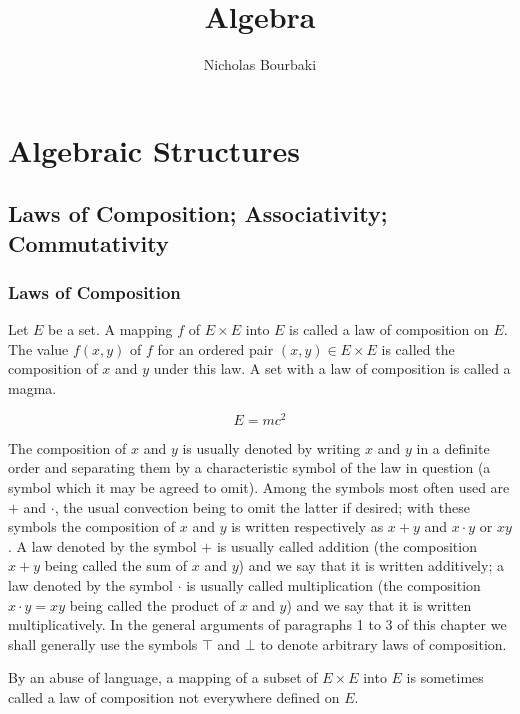 \documentclass[twoside,usebookdim]{bourbaki}
\title{Algebra}
\author{Nicholas Bourbaki}
\begin{document}
\frontmatter
\maketitle
\tableofcontents
\mainmatter
\chapter{Algebraic Structures}
\section{Laws of Composition; Associativity; Commutativity}
\subsection{Laws of Composition}

\begin{definition}
Let $E$ be a set. A mapping $f$ of $E\times E$ into $E$ is called a law
of composition on $E$. The value $f(x,y)$ of $f$ for an ordered pair
$(x,y)\in E\times E$ is called the composition of $x$ and $y$ under this
law. A set with a law of composition is called a magma.
\end{definition}

\begin{equation}
E = mc^{2}
\end{equation}

The composition of $x$ and $y$ is usually denoted by writing $x$ and $y$
in a definite order and separating them by a characteristic symbol of
the law in question (a symbol which it may be agreed to omit). Among the
symbols most often used are $+$ and $\cdot$, the usual convection being
to omit the latter if desired; with these symbols the composition of $x$
and $y$ is written respectively as $x + y$ and $x\cdot y$ or $xy$.
A law denoted by the symbol $+$ is usually called addition (the
composition $x + y$ being called the sum of $x$ and $y$) and we say that
it is written additively; a law denoted by the symbol $\cdot$ is usually
called multiplication (the composition $x\cdot y = xy$ being called the
product of $x$ and $y$) and we say that it is written
multiplicatively. In the general arguments of paragraphs 1 to 3 of this
chapter we shall generally use the symbols $\mathbin{\top}$ and $\bot$ to denote
arbitrary laws of composition.

By an abuse of language, a mapping of a subset of $E\times E$ into $E$
is sometimes called a law of composition not everywhere defined on $E$.
\end{document}
